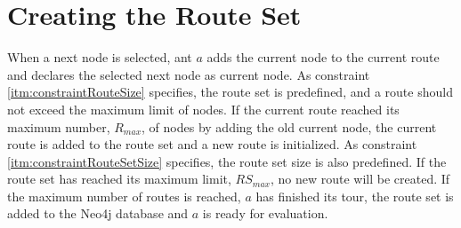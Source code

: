 \section{Creating the Route Set}

When a next node is selected, ant $a$ adds the current node to the current route and declares the selected next node as current node. As constraint \vref{itm:constraintRouteSize} specifies, the route set is predefined, and a route should not exceed the maximum limit of nodes. If the current route reached its maximum number, $R_{max}$, of nodes by adding the old current node, the current route is added to the route set and a new route is initialized. As constraint \vref{itm:constraintRouteSetSize} specifies, the route set size is also predefined. If the route set has reached its maximum limit, $RS_{max}$, no new route will be created. If the maximum number of routes is reached, $a$ has finished its tour, the route set is added to the Neo4j database and $a$ is ready for evaluation. 